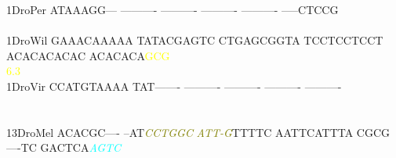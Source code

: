\documentclass[11pt,twoside,reqno,a4paper]{article}
\begin{document}
{1\hspace*{3\charwidth}DroPer	ATAAAGG---	----------	----------	----------	----------	-----CTCCG	\\
\hspace*{4\charwidth}\hspace*{7\charwidth}\hspace*{1\charwidth}\hspace*{1\charwidth}\hspace*{1\charwidth}\hspace*{1\charwidth}\hspace*{1\charwidth}\hspace*{1\charwidth}\\
1\hspace*{3\charwidth}DroWil	GAAACAAAAA	TATACGAGTC	CTGAGCGGTA	TCCTCCTCCT	ACACACACAC	ACACACA\textcolor{yellow}{G}\textcolor{yellow}{C}\textcolor{yellow}{G}	\\
\hspace*{4\charwidth}\hspace*{7\charwidth}\hspace*{1\charwidth}\hspace*{1\charwidth}\hspace*{1\charwidth}\hspace*{1\charwidth}\hspace*{1\charwidth}\hspace*{57\charwidth}\textcolor{yellow}{6.3}\hspace*{1\charwidth}\\
1\hspace*{3\charwidth}DroVir	CCATGTAAAA	TAT-------	----------	----------	----------	----------	\\
\hspace*{4\charwidth}\hspace*{7\charwidth}\hspace*{1\charwidth}\hspace*{1\charwidth}\hspace*{1\charwidth}\hspace*{1\charwidth}\hspace*{1\charwidth}\hspace*{1\charwidth}\\
\\
13\hspace*{2\charwidth}DroMel	ACACGC----	--AT\textit{\textcolor{olive}{C}}\textit{\textcolor{olive}{C}}\textit{\textcolor{olive}{T}}\textit{\textcolor{olive}{G}}\textit{\textcolor{olive}{G}}\textit{\textcolor{olive}{C}}	\textit{\textcolor{olive}{A}}\textit{\textcolor{olive}{T}}\textit{\textcolor{olive}{T}}\textit{\textcolor{olive}{-}}\textit{\textcolor{olive}{G}}TTTTC	AATTCATTTA	CGCG----TC	GACTCA\textit{\textcolor{cyan}{A}}\textit{\textcolor{cyan}{G}}\textit{\textcolor{cyan}{T}}\textit{\textcolor{cyan}{C}}	\\
}
\end{document}
